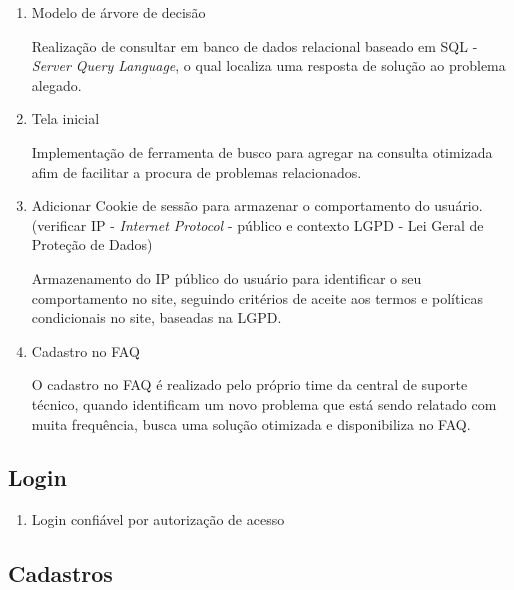 \documentclass[
    12pt,               %
    openright,          %
    oneside,
    a4paper,            %
    MODELO,             %
    english,            %
    brazil              %
   ]{ifsp-spo-inf-ctds}
\begin{document}
	\begin{enumerate}
		\item Modelo de árvore de decisão
		
		Realização de consultar em banco de dados relacional baseado em SQL - \textit{Server Query Language}, o qual localiza uma resposta de solução ao problema alegado.
		
		\item Tela inicial
		
		Implementação de ferramenta de busco para agregar na consulta otimizada afim de facilitar a procura de problemas relacionados.
		
		\item Adicionar Cookie de sessão para armazenar o comportamento do usuário. (verificar IP - \textit{Internet Protocol} - público e contexto LGPD - Lei Geral de Proteção de Dados)
		
		Armazenamento do IP público do usuário para identificar o seu comportamento no site, seguindo critérios de aceite aos termos e políticas condicionais no site, baseadas na LGPD.
		
		\item Cadastro no FAQ
		
		O cadastro no FAQ é realizado pelo próprio time da central de suporte técnico, quando identificam um novo problema que está sendo relatado com muita frequência, busca uma solução otimizada e disponibiliza no FAQ. 
	\end{enumerate}

\subsection{Login}

	\begin{enumerate}
		\item Login confiável por autorização de acesso
	\end{enumerate}

\subsection{Cadastros}
\end{document}
